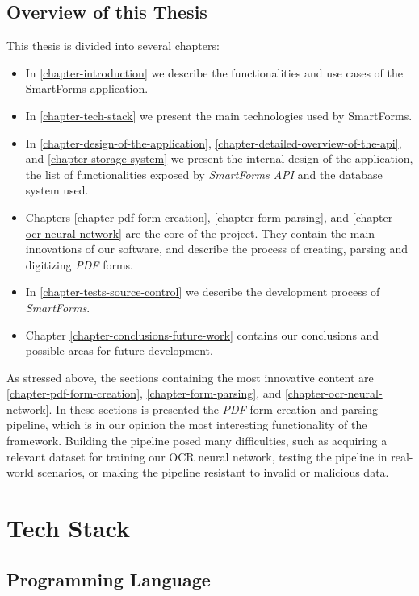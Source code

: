 \documentclass[11pt, a4paper]{report}
\begin{document}
\section{Overview of this Thesis}

This thesis is divided into several chapters:
\begin{itemize}
	\item In \autoref{chapter-introduction} we describe the functionalities and use cases of the SmartForms application.
	\item In \autoref{chapter-tech-stack} we present the main technologies used by SmartForms.
	\item In \autoref{chapter-design-of-the-application}, \autoref{chapter-detailed-overview-of-the-api}, and \autoref{chapter-storage-system} we present the internal design of the application, the list of functionalities exposed by \textit{SmartForms API} and the database system used.
	\item Chapters \ref{chapter-pdf-form-creation}, \ref{chapter-form-parsing}, and \ref{chapter-ocr-neural-network} are the core of the project. They contain the main innovations of our software, and describe the process of creating, parsing and digitizing \textit{PDF} forms.
	\item In \autoref{chapter-tests-source-control} we describe the development process of \textit{SmartForms}.
	\item Chapter \ref{chapter-conclusions-future-work} contains our conclusions and possible areas for future development.
\end{itemize}

As stressed above, the sections containing the most innovative content are  \autoref{chapter-pdf-form-creation}, \autoref{chapter-form-parsing}, and \autoref{chapter-ocr-neural-network}. In these sections is presented the \textit{PDF} form creation and parsing pipeline, which is in our opinion the most interesting functionality of the framework. Building the pipeline posed many difficulties, such as acquiring a relevant dataset for training our OCR neural network, testing the pipeline in real-world scenarios, or making the pipeline resistant to invalid or malicious data. 

\chapter{Tech Stack}
\label{chapter-tech-stack}

\section{Programming Language}
\end{document}
